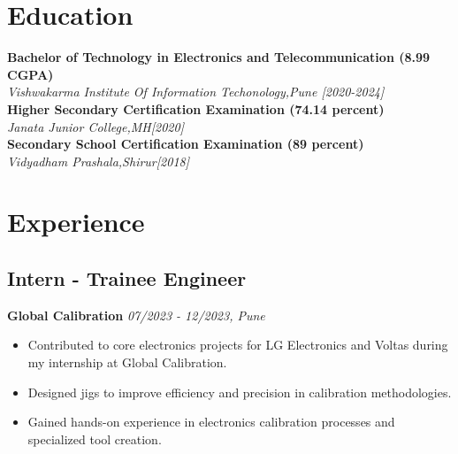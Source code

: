 \documentclass[letterpaper,10pt]{article}
\newcommand{\heading}[2]{
  \hspace{10pt}#1\hfill#2\\
}
\newcommand{\headingBf}[2]{
  \heading{\textbf{#1}}{\textbf{#2}}
}
\newcommand{\headingIt}[2]{
  \heading{\textit{#1}}{\textit{#2}}
}
\begin{document}

  \section{Education}

  \headingBf{Bachelor of Technology in Electronics and Telecommunication (8.99 CGPA)}{} %
  \headingIt{Vishwakarma Institute Of Information Techonology,Pune [2020-2024]}{}

  \headingBf{Higher Secondary Certification
 Examination (74.14 percent)}{} %
  \headingIt{Janata Junior College,MH[2020]}{}

 \headingBf{Secondary School Certification
 Examination (89 percent)}{} %
  \headingIt{Vidyadham Prashala,Shirur[2018]}{}



  \section{Experience}

  \subsection*{Intern - Trainee Engineer}
\textbf{Global Calibration} \hfill \textit{07/2023 - 12/2023, Pune}

\begin{itemize}[itemsep=1pt, parsep=1pt]
    \item Contributed to core electronics projects for LG Electronics and Voltas during my internship at Global Calibration.
    \item Designed jigs to improve efficiency and precision in calibration methodologies.
    \item Gained hands-on experience in electronics calibration processes and specialized tool creation.
\end{itemize}
\end{document}
